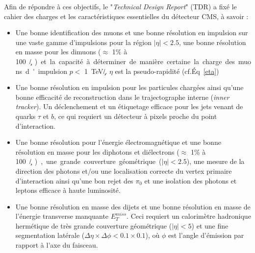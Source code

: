 Afin de répondre à ces objectifs, le "\textit{Technical Design Report}" (TDR) \cite{Bayatian:922757} a fixé le cahier des charges et les caractéristiques essentielles du détecteur CMS, à savoir :
\begin{itemize}[label=$\bullet$]
	\item Une bonne identification des muons et une bonne résolution en impulsion sur une vaste gamme d'impulsions pour la région $|\eta|<\num{2.5}$, une bonne résolution en masse pour les dimuons ($\approx$ \num{1}\% à \SI{100}{\giga\eV/\square\c}) et la capacité à déterminer de manière certaine la charge des muons d'impulsion $p<$ \SI{1}{\tera\eV/\c}. $\eta$ est la pseudo-rapidité (cf.Éq~\ref{eta})
	\item Une bonne résolution en impulsion pour les particules chargées ainsi qu'une bonne efficacité de reconstruction dans le trajectographe interne (\textit{inner tracker}). Un déclenchement et un étiquetage efficace pour les jets venant de quarks $\tau$ et $b$, ce qui requiert un détecteur à pixels proche du point d'interaction.
	\item Une bonne résolution pour l'énergie électromagnétique et une bonne résolution en masse pour les diphotons et diélectrons  ($\approx$ \num{1}\% à \SI{100}{\giga\eV/\square\c}), une grande couverture géométrique ($|\eta|<2.5$), une mesure de la direction des photons et/ou une localisation correcte du vertex primaire d'interaction ainsi qu'une bon rejet des $\pi_{0}$ et une isolation des photons et leptons efficace à haute luminosité.
	\item Une bonne résolution en masse des dijets et une bonne résolution en masse de l'énergie transverse manquante $E_{T}^{miss}$. Ceci requiert un calorimètre hadronique hermétique de très grande couverture géométrique ($|\eta|<5$) et une fine segmentation latérale ($\Delta\eta\times\Delta\phi<0.1\times0.1$), où $\phi$ est l'angle d'émission par rapport à l'axe du faisceau.
\end{itemize} 

